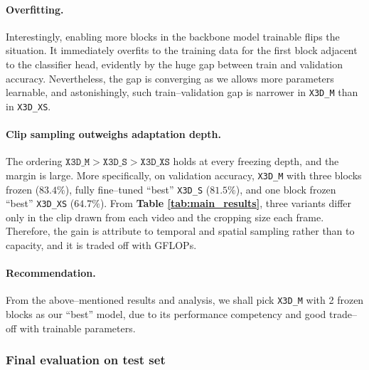 \paragraph{Overfitting.} Interestingly, enabling more blocks in the backbone model trainable flips the situation. It immediately overfits to the training data for the first block adjacent to the classifier head, evidently by the huge gap between train and validation accuracy.
Nevertheless, the gap is converging as we allows more parameters learnable, and astonishingly, such train–validation gap is narrower in \texttt{X3D\_M} than in \texttt{X3D\_XS}.

\paragraph{Clip sampling outweighs adaptation depth.} The ordering $\texttt{X3D\_M} > \texttt{X3D\_S} > \texttt{X3D\_XS}$ holds at every freezing depth, and the margin is large.
More specifically, on validation accuracy, \texttt{X3D\_M} with three blocks frozen ($83.4\%$), fully fine–tuned ``best'' \texttt{X3D\_S} ($81.5\%$), and one block frozen ``best'' \texttt{X3D\_XS} ($64.7\%$).
From \textbf{Table \ref{tab:main_results}}, three variants differ only in the clip drawn from each video and the cropping size each frame.
Therefore, the gain is attribute to temporal and spatial sampling rather than to capacity, and it is traded off with GFLOPs.

\paragraph{Recommendation.} From the above–mentioned results and analysis, we shall pick \texttt{X3D\_M} with 2 frozen blocks as our ``best'' model, due to its performance competency and good trade–off with trainable parameters.

\subsubsection{Final evaluation on test set}

